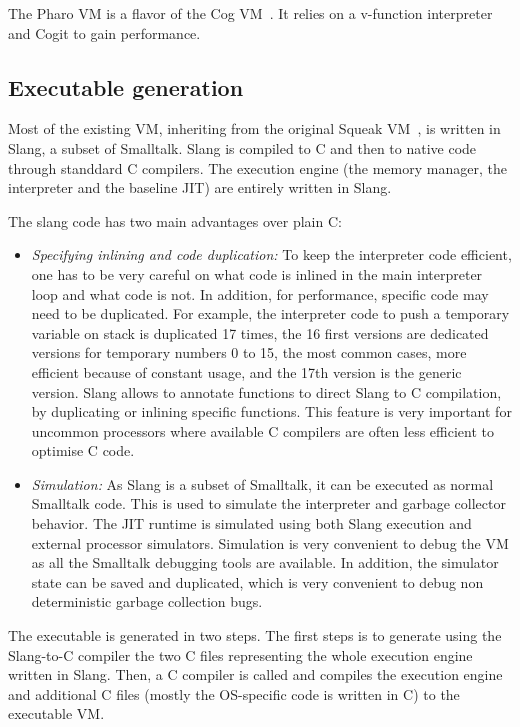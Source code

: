 \documentclass[a4paper,12pt,twoside]{../includes/ThesisStyle}
\begin{document}
The Pharo VM is a flavor of the Cog VM~\cite{Mira08a}. It relies on a v-function interpreter and Cogit to gain performance.

\subsection{Executable generation}

Most of the existing VM, inheriting from the original Squeak VM~\cite{Inga97a}, is written in Slang, a subset of Smalltalk. Slang is compiled to C and then to native code through standdard C compilers. The execution engine (the memory manager, the interpreter and the baseline JIT) are entirely written in Slang.

The slang code has two main advantages over plain C:
\begin{itemize}
	\item \emph{Specifying inlining and code duplication:} To keep the interpreter code efficient, one has to be very careful on what code is inlined in the main interpreter loop and what code is not. In addition, for performance, specific code may need to be duplicated. For example, the interpreter code to push a temporary variable on stack is duplicated 17 times, the 16 first versions are dedicated versions for temporary numbers 0 to 15, the most common cases, more efficient because of constant usage, and the 17th version is the generic version. Slang allows to annotate functions to direct Slang to C compilation, by duplicating or inlining specific functions. This feature is very important for uncommon processors where available C compilers are often less efficient to optimise C code.
	\item \emph{Simulation:} As Slang is a subset of Smalltalk, it can be executed as normal Smalltalk code. This is used to simulate the interpreter and garbage collector behavior. The JIT runtime is simulated using both Slang execution and external processor simulators. Simulation is very convenient to debug the VM as all the Smalltalk debugging tools are available. In addition, the simulator state can be saved and duplicated, which is very convenient to debug non deterministic garbage collection bugs.
\end{itemize}

The executable is generated in two steps. The first steps is to generate using the Slang-to-C compiler the two C files representing the whole execution engine written in Slang. Then, a C compiler is called and compiles the execution engine and additional C files (mostly the OS-specific code is written in C) to the executable VM.
\end{document}
